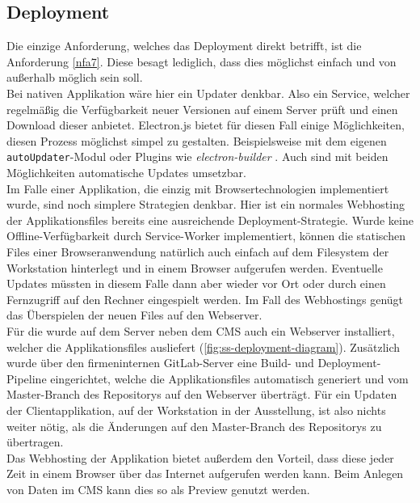\subsection{Deployment}
\label{subs:deployment}

Die einzige Anforderung, welches das Deployment direkt betrifft, ist die Anforderung
\ref{nfa7}. Diese besagt lediglich, dass dies möglichst einfach und von außerhalb möglich
sein soll.\\
Bei nativen Applikation wäre hier ein Updater denkbar. Also ein Service,
welcher regelmäßig die Verfügbarkeit neuer Versionen auf einem Server prüft und einen Download 
dieser anbietet. Electron.js bietet für diesen Fall einige Möglichkeiten, diesen Prozess 
möglichst simpel zu gestalten. Beispielsweise mit dem eigenen 
\texttt{autoUpdater}-Modul \cite{electron-autoUpdater} oder Plugins wie 
\emph{electron-builder} \cite{electron-builder}. Auch sind mit beiden Möglichkeiten
automatische Updates umsetzbar.\\
Im Falle einer Applikation, die einzig mit Browsertechnologien implementiert wurde, sind 
noch simplere Strategien denkbar. Hier ist ein normales Webhosting der Applikationsfiles 
bereits eine ausreichende Deployment-Strategie. Wurde keine Offline-Verfügbarkeit durch
Service-Worker implementiert, können die statischen Files einer Browseranwendung natürlich
auch einfach auf dem Filesystem der Workstation hinterlegt und in einem Browser aufgerufen 
werden. Eventuelle Updates müssten in diesem Falle dann aber wieder vor Ort oder durch einen
Fernzugriff auf den Rechner eingespielt werden. Im Fall des Webhostings genügt das Überspielen
der neuen Files auf den Webserver.\\

Für die \shst{} wurde auf dem Server neben dem CMS auch ein Webserver installiert, welcher die 
Applikationsfiles ausliefert (\autoref{fig:ss-deployment-diagram}). Zusätzlich wurde über den 
firmeninternen GitLab-Server \cite{gitlab} eine Build- und Deployment-Pipeline eingerichtet, welche die 
Applikationsfiles automatisch generiert und vom Master-Branch des Repositorys auf den Webserver überträgt. 
Für ein Updaten der Clientapplikation, auf der Workstation in der Ausstellung, ist also nichts weiter 
nötig, als die Änderungen auf den Master-Branch des Repositorys zu übertragen.\\
Das Webhosting der Applikation bietet außerdem den Vorteil, dass diese jeder Zeit in einem Browser 
über das Internet aufgerufen werden kann. Beim Anlegen von Daten im CMS kann dies so als
Preview genutzt werden.